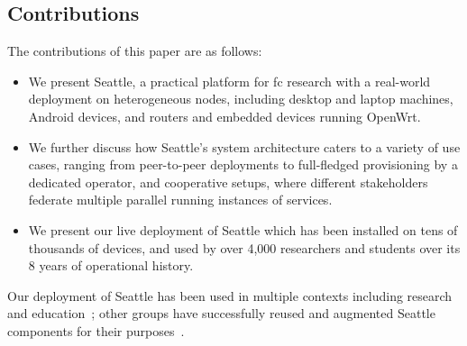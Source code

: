 \subsection{Contributions}

The contributions of this paper are as follows:
\begin{itemize}
\item We present Seattle, a practical platform for \gls{fc} research
with a real-world deployment on heterogeneous nodes,
including desktop and laptop machines, Android devices,
and routers and embedded devices running OpenWrt.
\item We further discuss how
Seattle's system architecture caters to a variety of use cases,
ranging from peer-to-peer deployments to full-fledged
provisioning by a dedicated operator, and cooperative setups,
where different stakeholders federate multiple parallel running
instances of services.
\item We present our live deployment of Seattle which has been
installed on tens of thousands of devices, and used by over 4,000
researchers and students over its 8 years of operational history.
\end{itemize}
Our deployment of Seattle has been used in multiple contexts
including research~\cite{li2015fence,rafetseder2013sensorium,zhuang2014sensibility,Eisl1010:Service,Tuts1010:Sustained,collares2011smart,zhuang2015privacy,cappos2014blursense,7133607} and education~\cite{Wallace_CCSC_2011,Cappos_CCSCCP_2010,Cappos_CCSCNW_2009,Cappos_SIGCSE_2014,Hooshangi_SIGCSE_2015};
other groups have successfully reused and augmented Seattle components
for their purposes~\cite{chard2010social,chard12ssc,caton2014social,muller2014tomato,tomato,eittenberger2012doubtless,zhuang2012distributed,zhuang2014taking,tredger2013building}.
